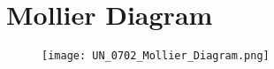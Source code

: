 \chapter{Mollier Diagram}
\label{app:mollier}

\begin{fullwidth}
\begin{figure}
\texttt{[image: UN\_0702\_Mollier\_Diagram.png]}
\end{figure}
\end{fullwidth}
